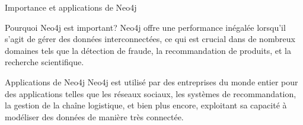 


\begin{frame}{Importance et applications de Neo4j}
  \begin{block}{Pourquoi Neo4j est important?}
    Neo4j offre une performance inégalée lorsqu'il s'agit de gérer des données interconnectées, ce qui est crucial dans de nombreux domaines tels que la détection de fraude, la recommandation de produits, et la recherche scientifique.
  \end{block}
  \begin{block}{Applications de Neo4j}
    Neo4j est utilisé par des entreprises du monde entier pour des applications telles que les réseaux sociaux, les systèmes de recommandation, la gestion de la chaîne logistique, et bien plus encore, exploitant sa capacité à modéliser des données de manière très connectée.
  \end{block}
\end{frame}